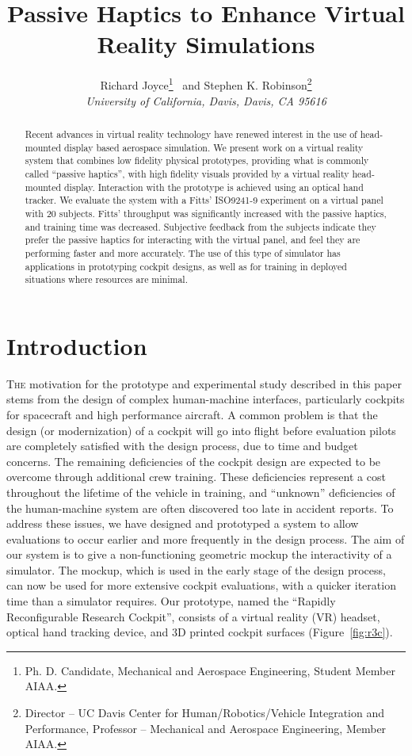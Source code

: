 \documentclass[]{aiaa-tc}%
\title{Passive Haptics to Enhance Virtual Reality Simulations}
\author{Richard Joyce\thanks{Ph. D. Candidate, Mechanical and Aerospace Engineering, Student Member AIAA.}
  \ and Stephen K. Robinson\thanks{Director – UC Davis Center for Human/Robotics/Vehicle Integration and Performance, Professor – Mechanical and Aerospace Engineering, Member AIAA.}\\
  {\normalsize\itshape University of California, Davis, Davis, CA 95616}\\
 }
\begin{document}
\maketitle

\begin{abstract}
Recent advances in virtual reality technology have renewed interest in the use of head-mounted display based aerospace simulation.
We present work on a virtual reality system that combines low fidelity physical prototypes, providing what is commonly called ``passive haptics'', with high fidelity visuals provided by a virtual reality head-mounted display.
Interaction with the prototype is achieved using an optical hand tracker.
We evaluate the system with a Fitts' ISO9241-9 experiment on a virtual panel with 20 subjects.
Fitts' throughput was significantly increased with the passive haptics, and training time was decreased.
Subjective feedback from the subjects indicate they prefer the passive haptics for interacting with the virtual panel, and feel they are performing faster and more accurately.
The use of this type of simulator has applications in prototyping cockpit designs, as well as for training in deployed situations where resources are minimal.
\end{abstract}

\section{Introduction}
\lettrine[nindent=0pt]{T}{he} motivation for the prototype and experimental study described in this paper stems from the design of complex human-machine interfaces, particularly cockpits for spacecraft and high performance aircraft.
A common problem is that the design (or modernization) of a cockpit will go into flight before evaluation pilots are completely satisfied with the design process, due to time and budget concerns.
The remaining deficiencies of the cockpit design are expected to be overcome through additional crew training.
These deficiencies represent a cost throughout the lifetime of the vehicle in training, and ``unknown'' deficiencies of the human-machine system are often discovered too late in accident reports.
To address these issues, we have designed and prototyped a system to allow evaluations to occur earlier and more frequently in the design process.
The aim of our system is to give a non-functioning geometric mockup the interactivity of a simulator.
The mockup, which is used in the early stage of the design process, can now be used for more extensive cockpit evaluations, with a quicker iteration time than a simulator requires.
Our prototype, named the ``Rapidly Reconfigurable Research Cockpit'', consists of a virtual reality (VR) headset, optical hand tracking device, and 3D printed cockpit surfaces (Figure~\ref{fig:r3c})\cite{joyce_rapidly_2015}.
\end{document}
